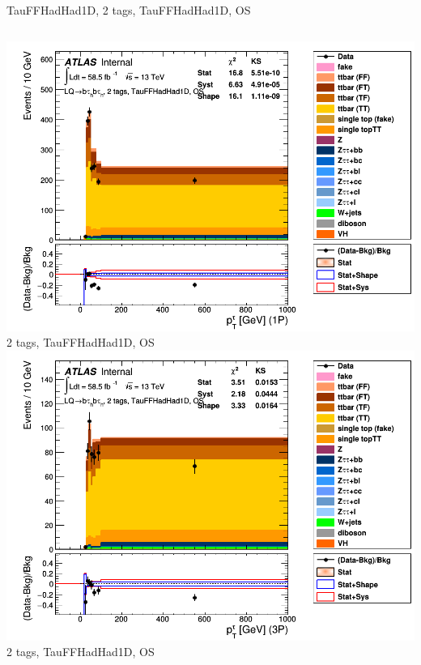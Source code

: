 \begin{frame}{TauFFHadHad1D, 2 tags, TauFFHadHad1D, OS}
  \begin{columns}[c]
    \centering\includegraphics[width=\textwidth]{C_2tag2pjet_0ptv_OS_TauPt1P}\\
    2 tags, TauFFHadHad1D, OS
    \centering\includegraphics[width=\textwidth]{C_2tag2pjet_0ptv_OS_TauPt3P}\\
    2 tags, TauFFHadHad1D, OS
  \end{columns}
  \begin{columns}[c]

\end{columns}
\end{frame}
